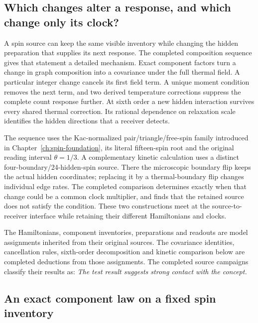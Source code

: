 \label{ch:spin-composition}

\subsection{Which changes alter a response, and which change only its clock?}

A spin source can keep the same visible inventory while changing the hidden preparation that supplies its next response. The completed composition sequence gives that statement a detailed mechanism. Exact component factors turn a change in graph composition into a covariance under the full thermal field. A particular integer change cancels its first field term. A unique moment condition removes the next term, and two derived temperature corrections suppress the complete count response further. At sixth order a new hidden interaction survives every shared thermal correction. Its rational dependence on relaxation scale identifies the hidden directions that a receiver detects.

The sequence uses the Kac-normalized pair/triangle/free-spin family introduced in Chapter~\ref{ch:spin-foundation}, its literal fifteen-spin root and the original reading interval $\theta=1/3$. A complementary kinetic calculation uses a distinct four-boundary/24-hidden-spin source. There the microscopic boundary flip keeps the actual hidden coordinates; replacing it by a thermal-boundary flip changes individual edge rates. The completed comparison determines exactly when that change could be a common clock multiplier, and finds that the retained source does not satisfy the condition. These two constructions meet at the source-to-receiver interface while retaining their different Hamiltonians and clocks.

The Hamiltonians, component inventories, preparations and readouts are model assignments inherited from their original sources. The covariance identities, cancellation rules, sixth-order decomposition and kinetic comparison below are completed deductions from those assignments. The completed source campaigns classify their results as: \emph{The test result suggests strong contact with the concept.}

\subsection{An exact component law on a fixed spin inventory}

